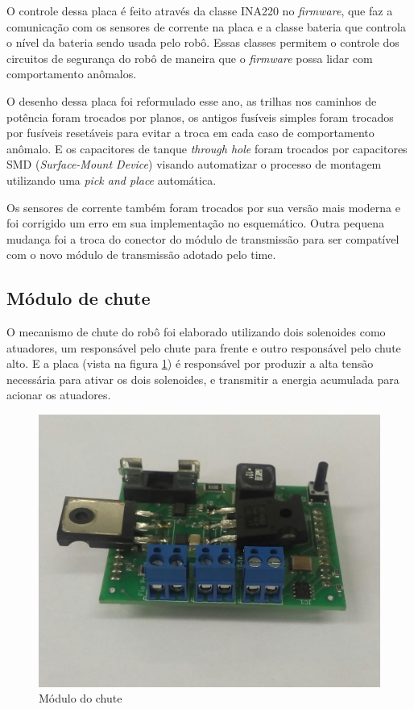 \documentclass[conference]{IEEEtran}
\begin{document}
O controle dessa placa é feito através da classe INA220 no \textit{firmware}, que faz a comunicação com os sensores de corrente na placa e a classe bateria que controla o nível da bateria sendo usada pelo robô. Essas classes permitem o controle dos circuitos de segurança do robô de maneira que o \textit{firmware} possa lidar com comportamento anômalos.

O desenho dessa placa foi reformulado esse ano, as trilhas nos caminhos de potência foram trocados por planos, os antigos fusíveis simples foram trocados por fusíveis resetáveis para evitar a troca em cada caso de comportamento anômalo. E os capacitores de tanque \textit{through hole} foram trocados por capacitores SMD (\textit{Surface-Mount Device}) visando automatizar o processo de montagem utilizando uma \textit{pick and place} automática.

Os sensores de corrente também foram trocados por sua versão mais moderna e foi corrigido um erro em sua implementação no esquemático. Outra pequena mudança foi a troca do conector do módulo de transmissão para ser compatível com o novo módulo de transmissão adotado pelo time.

\subsection{Módulo de chute}

O mecanismo de chute do robô foi elaborado utilizando dois solenoides como atuadores, um responsável pelo chute para frente e outro responsável pelo chute alto. E a placa (vista na figura \ref{img:modulochute}) é responsável por produzir a alta tensão necessária para ativar os dois solenoides, e transmitir a energia acumulada para acionar os atuadores.

\begin{figure}[thpb]	
	\centering
	\includegraphics[width=0.8\linewidth]{img/modulochute}
	\caption{Módulo do chute}
	\label{img:modulochute}
\end{figure}
\end{document}
